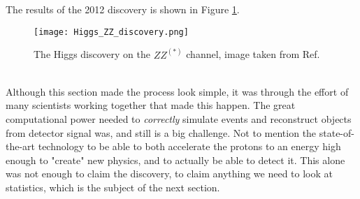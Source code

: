 \documentclass[12pt, a4paper]{book}
\begin{document}
The results of the 2012 discovery is shown in Figure \ref{fig:Higgs_ZZ}.\\
\begin{figure}[!ht]
	\centering
    \texttt{[image: Higgs\_ZZ\_discovery.png]}
    \caption[The Higgs discovery on the $ZZ^{(*)}$ channel]{The Higgs discovery on the $ZZ^{(*)}$ channel, image taken from Ref. \cite{Higgs_discovery_2012}}\label{fig:Higgs_ZZ}
\end{figure}
\\Although this section made the process look simple, it was through the effort of many scientists working together that made this happen. The great computational power needed to \textit{correctly} simulate events and reconstruct objects from detector signal was, and still is a big challenge.
Not to mention the state-of-the-art technology to be able to both accelerate the protons to an energy high enough to "create" new physics, and to actually be able to detect it. This alone was not enough to claim the discovery, 
to claim anything we need to look at statistics, which is the subject of the next section.
\end{document}
